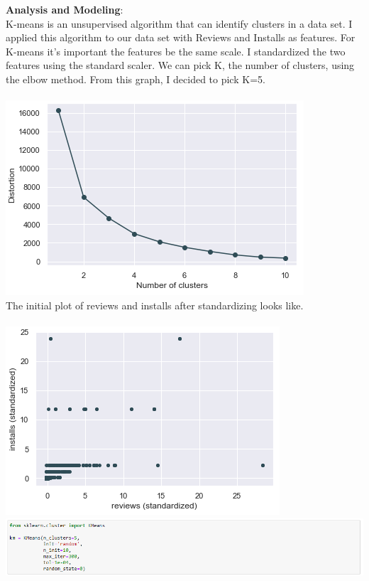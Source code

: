 \documentclass[11pt]{article}
\begin{document}
\textbf{Analysis and Modeling}: \\
K-means is an unsupervised algorithm that can identify clusters in a data set. I applied this algorithm to our data set with Reviews and Installs as features. For K-means it's important the features be the same scale. I standardized the two features using the standard scaler. We can pick K, the number of clusters, using the elbow method. From this graph, I decided to pick K=5. \\ \\
\includegraphics[scale=0.65]{elbow} \\ 
The initial plot of reviews and installs after standardizing looks like. \\ \\
\includegraphics[scale=0.65]{kmeans1} \\ 
\includegraphics[scale=0.65]{kmodel} \\ 
\end{document}
